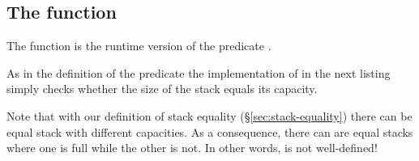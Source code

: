 
\subsection{The function \stackfull}

The function \stackfull is the runtime version of the predicate .



As in the definition of the predicate \StackFull the implementation of
\stackfull in the next listing simply checks whether the
size of the stack equals its capacity.



Note that with our definition of stack equality (\S\ref{sec:stack-equality})
there can be equal stack with different capacities.
As a consequence, there can are equal stacks where one is full while the other is not.
In other words, \stackfull is not well-defined!

